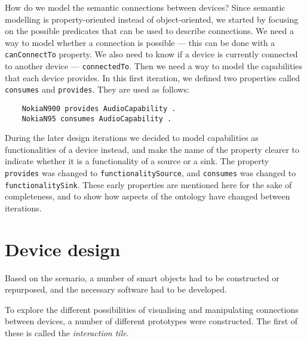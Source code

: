 How do we model the semantic connections between devices? Since semantic modelling is property-oriented instead of object-oriented, we started by focusing on the possible predicates that can be used to describe connections. We need a way to model whether a connection is possible --- this can be done with a \texttt{canConnectTo} property. We also need to know if a device is currently connected to another device --- \texttt{connectedTo}. Then we need a way to model the capabilities that each device provides. In this first iteration, we defined two properties called \texttt{consumes} and \texttt{provides}. They are used as follows:

\begin{verbatim}
	NokiaN900 provides AudioCapability .
	NokiaN95 consumes AudioCapability .
\end{verbatim}

During the later design iterations we decided to model capabilities as functionalities of a device instead, and make the name of the property clearer to indicate whether it is a functionality of a source or a sink. The property \texttt{provides} was changed to \texttt{functionalitySource}, and \texttt{consumes} was changed to \texttt{functionalitySink}. These early properties are mentioned here for the sake of completeness, and to show how aspects of the ontology have changed between iterations.



\section{Device design}
\label{DeviceDesign1}

Based on the scenario, a number of smart objects had to be constructed or repurposed, and the necessary software had to be developed.

To explore the different possibilities of visualising and manipulating connections between devices, a number of different prototypes were constructed. The first of these is called the \emph{interaction tile}. 

